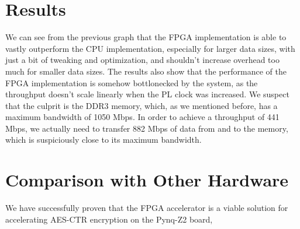 \documentclass[12pt,oneside,a4paper]{article}
\begin{document}
\section{Results} \label{sec:results}
We can see from the previous graph that the FPGA implementation is able to vastly outperform the CPU implementation, especially for larger data sizes, with just a bit of tweaking and optimization, and shouldn't increase overhead too much for smaller data sizes.
The results also show that the performance of the FPGA implementation is somehow bottlonecked by the system, as the throughput doesn't scale linearly when the PL clock was increased.
We suspect that the culprit is the DDR3 memory, which, as we mentioned before, has a maximum bandwidth of 1050 Mbps. In order to achieve a throughput of 441 Mbps, we actually need to transfer 882 Mbps of data from and to the memory, which is suspiciously close to its maximum bandwidth.


\section{Comparison with Other Hardware} \label{sec:conclusions}
We have successfully proven that the FPGA accelerator is a viable solution for accelerating AES-CTR encryption on the Pynq-Z2 board, 

\printbibliography
\end{document}
